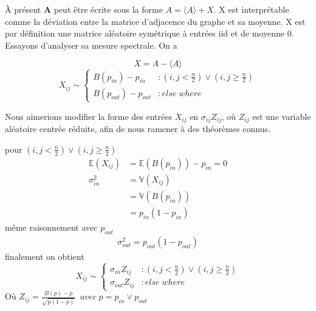 À présent \textbf{A} peut être écrite sous la forme $A = \langle A \rangle + X$.
X est interprétable comme la déviation entre la matrice d'adjacence du graphe et sa moyenne.
X est par définition une matrice aléatoire symétrique à entrées iid et de moyenne 0.
Essayons d'analyser sa mesure spectrale.
On a 

\begin{equation}
X = A - \langle A \rangle\nonumber
\end{equation}
\begin{equation}
	X_{ij} \sim \left\{
	\begin{array}{lr}
		B(p_{in}) - p_{in} & : (i,j < \frac{n}{2}) \lor (i,j \ge \frac{n}{2}) \\
		B(p_{out}) - p_{out} & : else \; where
	\end{array}
\right.\nonumber
\end{equation}

Nous aimerions modifier la forme des entrées $X_{ij}$ en $\sigma_{ij} Z_{ij}$, où $Z_{ij}$ est une variable aléatoire centrée réduite, afin de nous ramener à des théorèmes connus.

pour $(i,j < \frac{n}{2}) \lor (i,j \ge \frac{n}{2}) $
\begin{align*}
\mathbb{E}(X_{ij}) &= \mathbb{E}(B(p_{in}))- p_{in} = 0\\
\sigma_{in}^2 &= \mathbb{V}(X_{ij}) \\ 
			  &= \mathbb{V}(B(p_{in})) \\
			  &= p_{in} (1 - p_{in})
\end{align*}
même raisonnement avec $p_{out}$ 
\begin{align*}
\sigma_{out}^2 =  p_{out} (1 - p_{out})
\end{align*}
finalement on obtient 
\begin{equation}
	X_{ij} \sim \left\{
	\begin{array}{lr}
		\sigma_{in} Z_{ij} & : (i,j < \frac{n}{2}) \lor (i,j \ge \frac{n}{2}) \\
		\sigma_{out} Z_{ij} & : else \; where
	\end{array}
\right.\nonumber
\end{equation}
Où $Z_{ij} = \frac{B(p) - p}{\sqrt{p(1-p)}} \;\;avec \; p = p_{in} \lor p_{out}$\\

